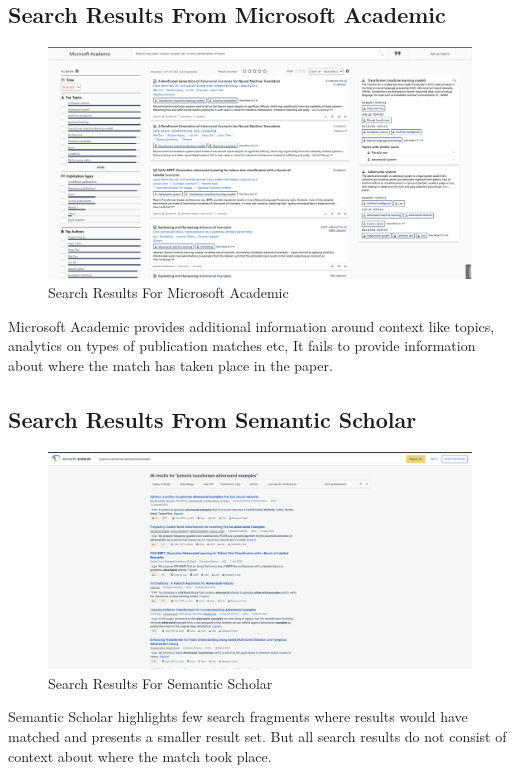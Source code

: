 \pagebreak
\subsection{Search Results From Microsoft Academic}
\label{sr-m}
\begin{figure}[h]
    \centering
    \includegraphics[width=\maxwidth{\textwidth}]{src/images/academic-example.png}
    \caption{Search Results For Microsoft Academic}
    \label{figure\arabic{figurecounter}}
\end{figure}
Microsoft Academic provides additional information around context like topics, analytics on types of publication matches etc,
It fails to provide information about where the match has taken place in the paper.

\pagebreak
\subsection{Search Results From Semantic Scholar}
\label{sr-s}
\begin{figure}[h]
    \centering
    \includegraphics[width=\maxwidth{\textwidth}]{src/images/ss-example.png}
    \caption{Search Results For Semantic Scholar}
    \label{figure\arabic{figurecounter}}
\end{figure}
Semantic Scholar highlights few search fragments where results would have matched and presents a smaller result set. 
But all search results do not consist of context about where the match took place. 


